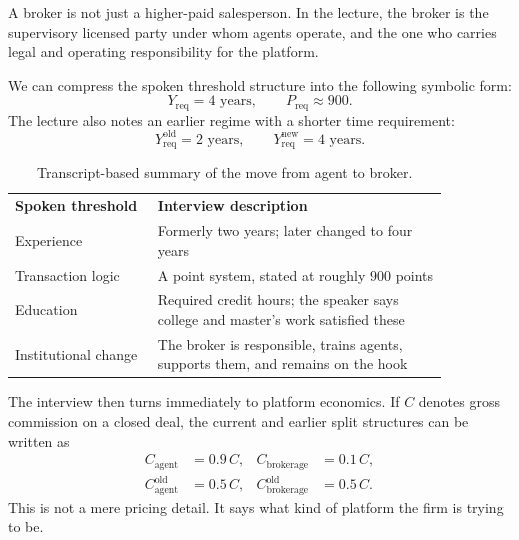 \begin{definition}
A broker is not just a higher-paid salesperson. In the lecture, the broker is the supervisory licensed party under whom agents operate, and the one who carries legal and operating responsibility for the platform.
\end{definition}

We can compress the spoken threshold structure into the following symbolic form:
\begin{equation}
Y_{\mathrm{req}} = 4 \text{ years},
\qquad
P_{\mathrm{req}} \approx 900 .
\end{equation}
The lecture also notes an earlier regime with a shorter time requirement:
\begin{equation}
Y_{\mathrm{req}}^{\mathrm{old}} = 2 \text{ years},
\qquad
Y_{\mathrm{req}}^{\mathrm{new}} = 4 \text{ years}.
\end{equation}

\begin{table}[h]
\centering
\begin{tabular}{p{0.28\linewidth}p{0.58\linewidth}}
\textbf{Spoken threshold} & \textbf{Interview description} \\
Experience & Formerly two years; later changed to four years \\
Transaction logic & A point system, stated at roughly \(900\) points \\
Education & Required credit hours; the speaker says college and master's work satisfied these \\
Institutional change & The broker is responsible, trains agents, supports them, and remains on the hook \\
\end{tabular}
\caption{Transcript-based summary of the move from agent to broker.}
\end{table}

The interview then turns immediately to platform economics. If \(C\) denotes gross commission on a closed deal, the current and earlier split structures can be written as
\begin{align}
C_{\mathrm{agent}} &= 0.9\,C,
&
C_{\mathrm{brokerage}} &= 0.1\,C,
\\
C_{\mathrm{agent}}^{\mathrm{old}} &= 0.5\,C,
&
C_{\mathrm{brokerage}}^{\mathrm{old}} &= 0.5\,C.
\end{align}
This is not a mere pricing detail. It says what kind of platform the firm is trying to be.

